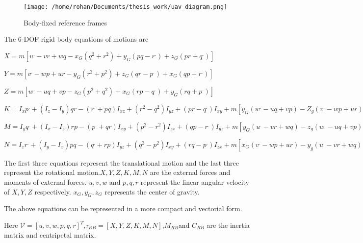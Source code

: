 \documentclass[12pt]{dalcsthesis}
\begin{document}
\begin{figure}
\caption{Body-fixed reference frames}


\texttt{[image: /home/rohan/Documents/thesis\_work/uav\_diagram.png]}

\end{figure}


The 6-DOF rigid body equations of motions are 

$X=m[u^{.}-vr+wq-x_{G}(q^{2}+r^{2})+y_{G}(pq-r^{.})+z_{G}(pr+q^{.})]$


$Y=m[v^{.}-wp+ur-y_{G}(r^{2}+p^{2})+z_{G}(qr-p^{.})+x_{G}(qp+r^{.})]$

$Z=m[w^{.}-uq+vp-z_{G}(p^{2}+q^{2})+x_{G}(rp-q^{.})+y_{G}(rq+p^{.})]$

$K=I_{x}p^{.}+(I_{z}-I_{y})qr-(r^{.}+pq)I_{xz}+(r^{2}-q^{2})I_{yz}+(pr-q^{.})I_{xy}+m[y_{G}(w^{.}-uq+vp)-Z_{g}(v^{.}-wp+ur)]$

$M=I_{y}q^{.}+(I_{x}-I_{z})rp-(p^{.}+qr)I_{xy}+(p^{2}-r^{2})I_{zx}+(qp-r^{.})I_{yz}+m[y_{G}(u^{.}-vr+wq)-z_{g}(w^{.}-uq+vp)]$

$N=I_{z}r^{.}+(I_{y}-I_{x})pq-(q^{.}+rp)I_{yz}+(q^{2}-p^{2})I_{xy}+(rq-p^{.})I_{zx}+m[x_{G}(v^{.}-wp+ur)-y_{g}(u^{.}-vr+wq)]$

The first three equations represent the translational motion and the
last three represent the rotational motion.$X,Y,Z,K,M,N$ are the
external forces and moments of external forces. $u,v,w$ and $p,q,r$
represent the linear angular velocity of $X,Y,Z$ respectively. $x_{G},y_{G},z_{G}$
represents the center of gravity.

The above equations can be represented in a more compact and vectorial
form.


Here $\mathcal{V}=[u,v,w,p,q,r]^{T}$,$\tau_{RB}=[X,Y,Z,K,M,N]$,$M_{RB}$and
$C_{RB}$ are the inertia matrix and centripetal matrix. 
\end{document}
